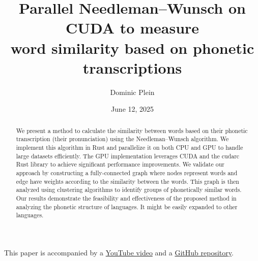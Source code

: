\documentclass[10pt,a4paper,english]{article}
\title{\vspace{-0.0em}Parallel Needleman–Wunsch on CUDA to measure\\
word similarity based on phonetic transcriptions}
\author{Dominic Plein}
\date{June 12, 2025}
\newcommand{\abstractText}{\noindent
	\newline\noindent
    We present a method to calculate the similarity between words based on their phonetic transcription (their pronunciation) using the Needleman–Wunsch algorithm. We implement this algorithm in Rust and parallelize it on both CPU and GPU to handle large datasets efficiently. The GPU implementation leverages CUDA and the cudarc Rust library to achieve significant performance improvements. We validate our approach by constructing a fully-connected graph where nodes represent words and edge have weights according to the similarity between the words. This graph is then analyzed using clustering algorithms to identify groups of phonetically similar words. Our results demonstrate the feasibility and effectiveness of the proposed method in analyzing the phonetic structure of languages. It might be easily expanded to other languages.
}
\begin{document}
\setlength{\abovedisplayskip}{0.2em}

\maketitle

\begin{abstract}
    \abstractText
    \newline
    \newline
\end{abstract}

\vspace{-2em}
\begin{center}
    This paper is accompanied by a \href{https://youtu.be/xbcpnItE3_4}{YouTube video} and a \href{https://github.com/Splines/phonetics-graph/}{GitHub repository}.
\end{center}

\begin{multicols*}{2}
\tableofcontents

\newcolumn






\end{multicols*}

\renewcommand*{\glsgroupskip}{} %
\printglossary[type=\acronymtype]

\printbibliography[
    heading=bibintoc,
    title={Bibliography},
    keyword={lit}
]
\printbibliography[
    title={Data sources \& Tools},
    keyword={data}
]
\end{document}
